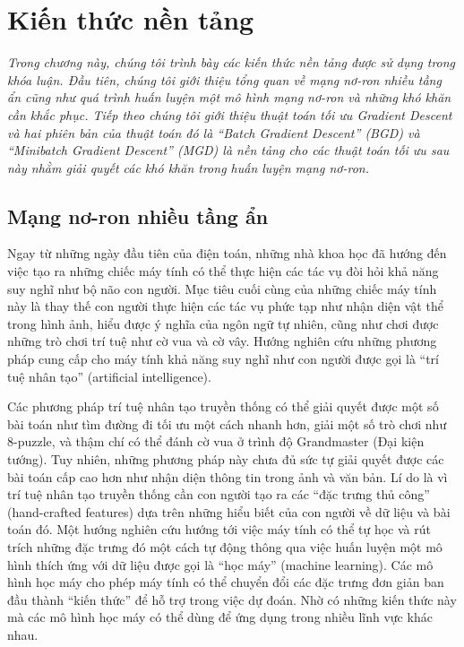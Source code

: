 \chapter{Kiến thức nền tảng}
\label{Chapter2}

\textit{Trong chương này, chúng tôi trình bày các kiến thức nền tảng được sử dụng trong khóa luận. Đầu tiên, chúng tôi giới thiệu tổng quan về mạng nơ-ron nhiều tầng ẩn cũng như quá trình huấn luyện một mô hình mạng nơ-ron và những khó khăn cần khắc phục. Tiếp theo chúng tôi giới thiệu thuật toán tối ưu Gradient Descent và hai phiên bản của thuật toán đó là ``Batch Gradient Descent'' (BGD) và ``Minibatch Gradient Descent'' (MGD) là nền tảng cho các thuật toán tối ưu sau này nhằm giải quyết các khó khăn trong huấn luyện mạng nơ-ron.}

\section{Mạng nơ-ron nhiều tầng ẩn}

Ngay từ những ngày đầu tiên của điện toán, những nhà khoa học đã hướng đến việc tạo ra những chiếc máy tính có thể thực hiện các tác vụ đòi hỏi khả năng suy nghĩ như bộ não con người. Mục tiêu cuối cùng của những chiếc máy tính này là thay thế con người thực hiện các tác vụ phức tạp như nhận diện vật thể trong hình ảnh, hiểu được ý nghĩa của ngôn ngữ tự nhiên, cũng như chơi được những trò chơi trí tuệ như cờ vua và cờ vây. Hướng nghiên cứu những phương pháp cung cấp cho máy tính khả năng suy nghĩ như con người được gọi là ``trí tuệ nhân tạo'' (artificial intelligence).

Các phương pháp trí tuệ nhân tạo truyền thống có thể giải quyết được một số bài toán như tìm đường đi tối ưu một cách nhanh hơn, giải một số trò chơi như 8-puzzle, và thậm chí có thể đánh cờ vua ở trình độ Grandmaster (Đại kiện tướng)\cite{campbell2001deepblue}. Tuy nhiên, những phương pháp này chưa đủ sức tự giải quyết được các bài toán cấp cao hơn như nhận diện thông tin trong ảnh và văn bản. Lí do là vì trí tuệ nhân tạo truyền thống cần con người tạo ra các ``đặc trưng thủ công'' (hand-crafted features) dựa trên những hiểu biết của con người về dữ liệu và bài toán đó. Một hướng nghiên cứu hướng tới việc máy tính có thể tự học và rút trích những đặc trưng đó một cách tự động thông qua việc huấn luyện một mô hình thích ứng với dữ liệu được gọi là ``học máy'' (machine learning). Các mô hình học máy cho phép máy tính có thể chuyển đổi các đặc trưng đơn giản ban đầu thành ``kiến thức'' để hỗ trợ trong việc dự đoán. Nhờ có những kiến thức này mà các mô hình học máy có thể dùng để ứng dụng trong nhiều lĩnh vực khác nhau.

